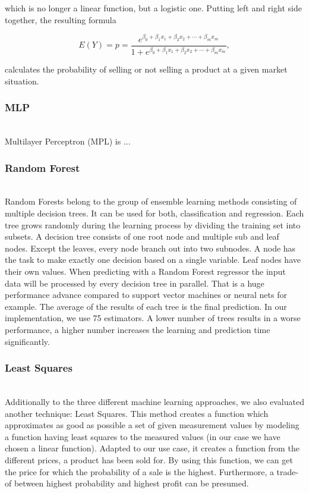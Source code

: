     which is no longer a linear function, but a logistic one. Putting left and right side together, the resulting formula

    \begin{equation}
    \label{eq.logreg.logsolved}
    E(Y) = p = \frac{e^{\beta _{0}+\beta _{1}x_{1}+\beta _{2}x_{2}+\cdots +\beta _{m}x_{m}}}{1+e^{\beta _{0}+\beta _{1}x_{1}+\beta _{2}x_{2}+\cdots +\beta _{m}x_{m}}},
    \end{equation}

    calculates the probability of selling or not selling a product at a given market situation.

\subsubsection{MLP}
    ~\\
    Multilayer Perceptron (MPL) is ...
\subsubsection{Random Forest}
    ~\\
    Random Forests belong to the group of ensemble learning methods consisting of multiple decision trees. It can be used for both, classification and regression. Each tree grows randomly during the learning process by dividing the training set into subsets. A decision tree consists of one root node and multiple sub and leaf nodes. Except the leaves, every node branch out into two subnodes. A node has the task to make exactly one decision based on a single variable. Leaf nodes have their own values. When predicting with a Random Forest regressor the input data will be processed by every decision tree in parallel. That is a huge performance advance compared to support vector machines or neural nets for example. The average of the results of each tree is the final prediction.
    In our implementation, we use 75 estimators. A lower number of trees results in a worse performance, a higher number increases the learning and prediction time significantly.
\subsubsection{Least Squares}
	~\\
	Additionally to the three different machine learning approaches, we also evaluated another technique: Least Squares. This method creates a function which approximates as good as possible a set of given measurement values by modeling a function having least squares to the measured values (in our case we have chosen a linear function). Adapted to our use case, it creates a function from the different prices, a product has been sold for. By using this function, we can get the price for which the probability of a sale is the highest. Furthermore, a trade-of between highest probability and highest profit can be presumed.
